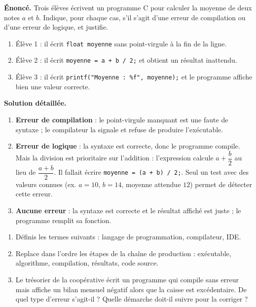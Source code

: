 \documentclass[11pt]{article}
\begin{document}
\begin{exoresolu}
\textbf{Énoncé.} Trois élèves écrivent un programme C pour calculer la moyenne de deux notes $a$ et $b$. Indique, pour chaque cas, s'il s'agit d'une erreur de compilation ou d'une erreur de logique, et justifie.
\begin{enumerate}
\item Élève 1 : il écrit \texttt{float moyenne} sans point-virgule à la fin de la ligne.
\item Élève 2 : il écrit \texttt{moyenne = a + b / 2;} et obtient un résultat inattendu.
\item Élève 3 : il écrit \texttt{printf("Moyenne : \%f", moyenne);} et le programme affiche bien une valeur correcte.
\end{enumerate}
\tcblower
\textbf{Solution détaillée.}
\begin{enumerate}
\item \textbf{Erreur de compilation} : le point-virgule manquant est une faute de syntaxe ; le compilateur la signale et refuse de produire l'exécutable.
\item \textbf{Erreur de logique} : la syntaxe est correcte, donc le programme compile. Mais la division est prioritaire sur l'addition : l'expression calcule $a + \dfrac{b}{2}$ au lieu de $\dfrac{a+b}{2}$. Il fallait écrire \texttt{moyenne = (a + b) / 2;}. Seul un test avec des valeurs connues (ex. $a = 10$, $b = 14$, moyenne attendue $12$) permet de détecter cette erreur.
\item \textbf{Aucune erreur} : la syntaxe est correcte et le résultat affiché est juste ; le programme remplit sa fonction.
\end{enumerate}
\end{exoresolu}

\begin{exercice}
\begin{enumerate}
\item Définis les termes suivants : langage de programmation, compilateur, IDE.
\item Replace dans l'ordre les étapes de la chaîne de production : exécutable, algorithme, compilation, résultats, code source.
\item Le trésorier de la coopérative écrit un programme qui compile sans erreur mais affiche un bilan mensuel négatif alors que la caisse est excédentaire. De quel type d'erreur s'agit-il ? Quelle démarche doit-il suivre pour la corriger ?
\end{enumerate}
\end{exercice}
\end{document}
